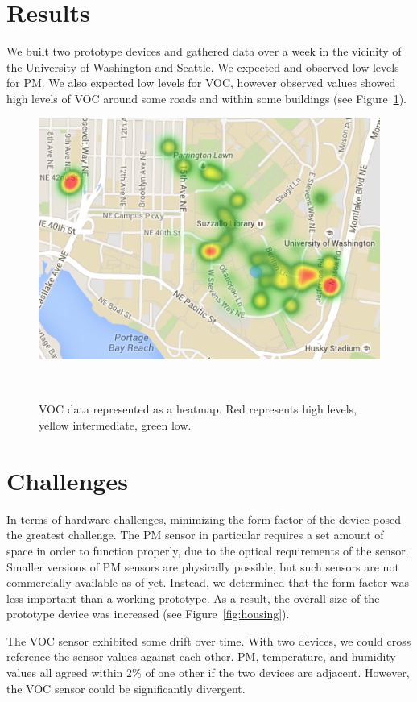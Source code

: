 \documentclass{sigchi}
\begin{document}
\section{Results}
We built two prototype devices and gathered data over a week in the vicinity of the University of Washington and Seattle.
We expected and observed low levels for PM.
We also expected low levels for VOC, however observed values showed high levels of VOC around some roads and within some buildings (see Figure~\ref{fig:voc heatmap}).
\begin{figure}
    \centering
    \includegraphics[width=0.9\columnwidth]{figures/VOC-Heatmap.png}
    \caption{VOC data represented as a heatmap.  Red represents high levels, yellow intermediate, green low.}
    ~\label{fig:voc heatmap}
\end{figure}

\section{Challenges}
In terms of hardware challenges, minimizing the form factor of the device posed the greatest challenge.
The PM sensor in particular requires a set amount of space in order to function properly, due to the optical requirements of the sensor.
Smaller versions of PM sensors are physically possible\cite{PMSensor:Article}, but such sensors are not commercially available as of yet.
Instead, we determined that the form factor was less important than a working prototype.
As a result, the overall size of the prototype device was increased (see Figure~\ref{fig:housing}).

The VOC sensor exhibited some drift over time.
With two devices, we could cross reference the sensor values against each other.
PM, temperature, and humidity values all agreed within 2\% of one other if the two devices are adjacent.
However, the VOC sensor could be significantly divergent.
\end{document}
